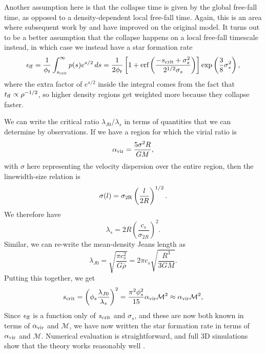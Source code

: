 Another assumption here is that the collapse time is given by the global free-fall time, as opposed to a density-dependent local free-fall time. Again, this is an area where subsequent work by \citet{hennebelle11b} and \citet{federrath12a} have improved on the original model. It turns out to be a better assumption that the collapse happens on a local free-fall timescale instead, in which case we instead have a star formation rate
\begin{equation}
\epsilon_{\rm ff} = \frac{1}{\phi_t} \int_{s_{\rm crit}}^\infty p(s) e^{s/2} \, ds
= \frac{1}{2\phi_t} \left[1+\mbox{erf}\left(\frac{-s_{\rm crit}+\sigma_s^2}{2^{1/2}\sigma_s}\right)\right] \exp\left(\frac{3}{8}\sigma_s^2\right),
\end{equation}
where the extra factor of $e^{s/2}$ inside the integral comes from the fact that $t_{\rm ff} \propto \rho^{-1/2}$, so higher density regions get weighted more because they collapse faster.

We can write the critical ratio $\lambda_{J0}/\lambda_s$ in terms of quantities that we can determine by observations. If we have a region for which the virial ratio is
\begin{equation}
\alpha_{\mathrm{vir}} = \frac{5\sigma^2 R}{GM},
\end{equation}
with $\sigma$ here representing the velocity dispersion over the entire region, then the linewidth-size relation is
\begin{equation}
\sigma(l) = \sigma_{\rm 2R} \left(\frac{l}{2R}\right)^{1/2}.
\end{equation}
We therefore have
\begin{equation}
\lambda_s = 2R \left(\frac{c_s}{\sigma_{2R}}\right)^2.
\end{equation}
Similar, we can re-write the mean-density Jeans length as
\begin{equation}
\lambda_{J0} = \sqrt{\frac{\pi c_s^2}{G\overline{\rho}}} = 2\pi c_s \sqrt{\frac{R^3}{3 GM}}.
\end{equation}
Putting this together, we get
\begin{equation}
s_{\rm crit} = \left(\phi_s \frac{\lambda_{J0}}{\lambda_s}\right)^2 = \frac{\pi^2 \phi_s^2}{15} \alpha_{\mathrm{vir}} \mathcal{M}^2 \approx \alpha_{\mathrm{vir}} \mathcal{M}^2,
\end{equation}
Since $\epsilon_{\rm ff}$ is a function only of $s_{\rm crit}$ and $\sigma_s$, and these are now both known in terms of $\alpha_{\mathrm{vir}}$ and $\mathcal{M}$, we have now written the star formation rate in terms of $\alpha_{\mathrm{vir}}$ and $\mathcal{M}$. Numerical evaluation is straightforward, and full 3D simulations show that the theory works reasonably well \citep{federrath12a}. 

